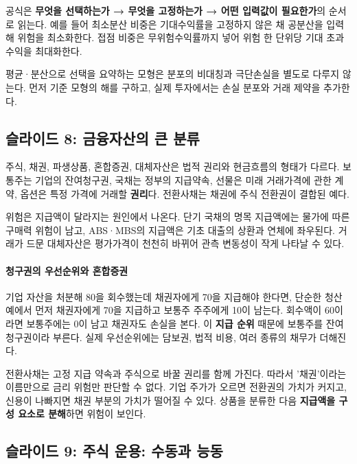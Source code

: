 \documentclass[11pt,a4paper]{article}
\begin{document}
공식은 \textbf{무엇을 선택하는가 → 무엇을 고정하는가 → 어떤 입력값이 필요한가}의 순서로 읽는다. 예를 들어 최소분산 비중은 기대수익률을 고정하지 않은 채 공분산을 입력해 위험을 최소화한다. 접점 비중은 무위험수익률까지 넣어 위험 한 단위당 기대 초과수익을 최대화한다.
\par

평균·분산으로 선택을 요약하는 모형은 분포의 비대칭과 극단손실을 별도로 다루지 않는다. 먼저 기준 모형의 해를 구하고, 실제 투자에서는 손실 분포와 거래 제약을 추가한다.
\par

\subsection{슬라이드 8: 금융자산의 큰 분류}

주식, 채권, 파생상품, 혼합증권, 대체자산은 법적 권리와 현금흐름의 형태가 다르다. 보통주는 기업의 잔여청구권, 국채는 정부의 지급약속, 선물은 미래 거래가격에 관한 계약, 옵션은 특정 가격에 거래할 \textbf{권리}다. 전환사채는 채권에 주식 전환권이 결합된 예다.
\par

위험은 지급액이 달라지는 원인에서 나온다. 단기 국채의 명목 지급액에는 물가에 따른 구매력 위험이 남고, ABS·MBS의 지급액은 기초 대출의 상환과 연체에 좌우된다. 거래가 드문 대체자산은 평가가격이 천천히 바뀌어 관측 변동성이 작게 나타날 수 있다.
\par

\paragraph{청구권의 우선순위와 혼합증권}

기업 자산을 처분해 80을 회수했는데 채권자에게 70을 지급해야 한다면, 단순한 청산 예에서 먼저 채권자에게 70을 지급하고 보통주 주주에게 10이 남는다. 회수액이 60이라면 보통주에는 0이 남고 채권자도 손실을 본다. 이 \textbf{지급 순위} 때문에 보통주를 잔여청구권이라 부른다. 실제 우선순위에는 담보권, 법적 비용, 여러 종류의 채무가 더해진다.
\par

전환사채는 고정 지급 약속과 주식으로 바꿀 권리를 함께 가진다. 따라서 '채권'이라는 이름만으로 금리 위험만 판단할 수 없다. 기업 주가가 오르면 전환권의 가치가 커지고, 신용이 나빠지면 채권 부분의 가치가 떨어질 수 있다. 상품을 분류한 다음 \textbf{지급액을 구성 요소로 분해}하면 위험이 보인다.
\par

\subsection{슬라이드 9: 주식 운용: 수동과 능동}
\end{document}
